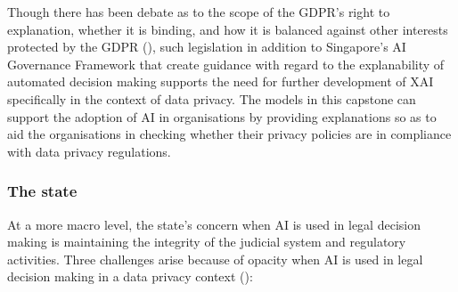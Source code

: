Though there has been debate as to the scope of the GDPR's right to explanation, whether it is binding, and how it is balanced against other interests protected by the GDPR (\cite{chesterman2021_transparency}), such legislation in addition to Singapore's AI Governance Framework that create guidance with regard to the explanability of automated decision making supports the need for further development of XAI specifically in the context of data privacy. The models in this capstone can support the adoption of AI in organisations by providing explanations so as to aid the organisations in checking whether their privacy policies are in compliance with data privacy regulations.

\subsubsection{The state}
At a more macro level, the state's concern when AI is used in legal decision making is maintaining the integrity of the judicial system and regulatory activities. Three challenges arise because of opacity when AI is used in legal decision making in a data privacy context (\cite{chesterman2021_opacity}): 

